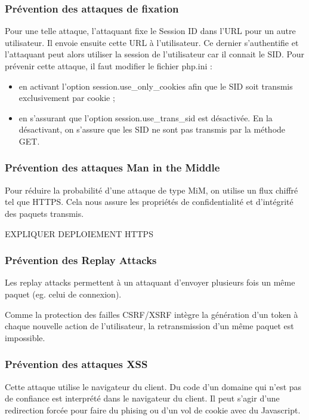 \documentclass[a4paper]{article}
\begin{document}
\subsubsection{Prévention des attaques de fixation}
Pour une telle attaque, l'attaquant fixe le Session ID dans l'URL pour
un autre utilisateur. Il envoie ensuite cette URL à l'utilisateur. Ce
dernier s'authentifie et l'attaquant peut alors utiliser la session de
l'utilisateur car il connait le SID. Pour prévenir cette attaque, il faut
modifier le fichier php.ini :

\begin{itemize}
	\item en activant l'option session.use\_only\_cookies afin que
		le SID soit transmis exclusivement par cookie ;
	\item en s'assurant que l'option session.use\_trans\_sid est désactivée. 
	En la désactivant, on s'assure que les SID ne sont pas transmis par la méthode GET.
\end{itemize}

\subsubsection{Prévention des attaques Man in the Middle}
Pour réduire la probabilité d'une attaque de type MiM, on utilise un flux
chiffré tel que HTTPS. Cela nous assure les propriétés de confidentialité
et d'intégrité des paquets transmis.

EXPLIQUER DEPLOIEMENT HTTPS

\subsubsection{Prévention des \og Replay Attacks \fg}
Les replay attacks permettent à un attaquant d'envoyer plusieurs fois un
même paquet (eg. celui de connexion).

Comme la protection des failles CSRF/XSRF intègre la génération d'un
token à chaque nouvelle action de l'utilisateur, la retransmission d'un
même paquet est impossible.

\subsubsection{Prévention des attaques XSS}
 		
Cette attaque utilise le navigateur du client. Du code d'un domaine qui
n'est pas de confiance est interprété dans le navigateur du client.
Il peut s'agir d'une redirection forcée pour faire  du phising
ou d'un vol de cookie avec du Javascript.
\end{document}

